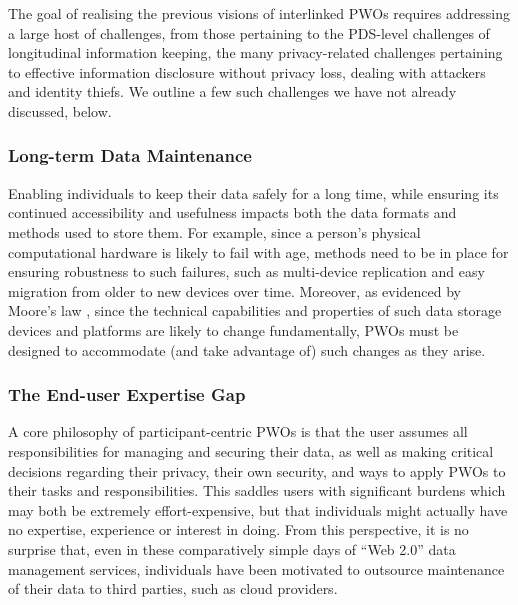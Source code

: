 \documentclass{sig-alternate}
\begin{document}


The goal of realising the previous visions of interlinked PWOs requires addressing a large host of challenges, from those pertaining to the PDS-level challenges of longitudinal information keeping, the many privacy-related challenges pertaining to effective information disclosure without privacy loss, dealing with attackers and identity thiefs.  We outline a few such challenges we have not already discussed, below.

\subsubsection{Long-term Data Maintenance}

Enabling individuals to keep their data safely for a long time, while ensuring its continued accessibility and usefulness impacts both the data formats and methods used to store them.  For example, since a person's physical computational hardware is likely to fail with age, methods need to be in place for ensuring robustness to such failures, such as multi-device replication and easy migration from older to new devices over time.   Moreover, as evidenced by Moore's law \cite{schaller1997moore}, since the technical capabilities and properties of such data storage devices and platforms are likely to change fundamentally, PWOs must be designed to accommodate (and take advantage of) such changes as they arise. 

\subsubsection{The End-user Expertise Gap}

A core philosophy of participant-centric PWOs is that the user assumes all responsibilities for managing and securing their data, as well as making critical decisions regarding their privacy, their own security, and ways to apply PWOs to their tasks and responsibilities.  This saddles users with significant burdens which may both be extremely effort-expensive, but that individuals might actually have no expertise, experience or interest in doing.  From this perspective, it is no surprise that, even in these comparatively simple days of ``Web 2.0'' data management services, individuals have been motivated to outsource maintenance of their data to third parties, such as cloud providers. 
\end{document}
